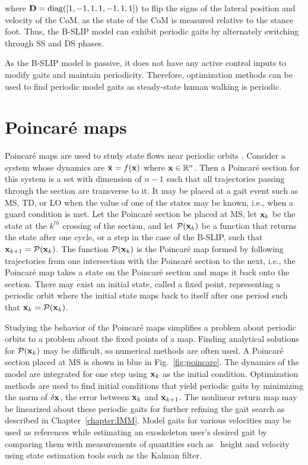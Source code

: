 %
%
where $ \mathbf{D} = {\rm diag}([1 ,-1 ,1 ,1 ,-1 ,1 ,1]) $ to flip the signs of the lateral position and velocity of the CoM, as the state of the CoM is measured relative to the stance foot. Thus, the B-SLIP model can exhibit periodic gaits by alternately switching through SS and DS phases.

As the B-SLIP model is passive, it does not have any active control inputs to modify gaits and maintain periodicity. Therefore, optimization methods can be used to find periodic model gaits \cite{strogatz2018nonlinear,garcia1998simplest} as steady-state human walking is periodic. 

\section{Poincar\'e maps}

Poincar\'e maps are used to study state flows near periodic orbits \cite{strogatz2018nonlinear}. Consider a system whose dynamics are $ \dot{\mathbf{x}} = f(\mathbf{x}) $ where $ \mathbf{x} \in \mathbb{R}^n $. Then a  Poincar\'e section for this system is a set with dimension of $ n-1 $ such that all trajectories passing through the section are transverse to it. It may be placed at a gait event such as MS, TD, or LO when the value of one of the states may be known, i.e., when a guard condition is met. Let the Poincar\'e section be placed at MS, let $ \mathbf{x}_k $ be the state at the $ k^{th} $ crossing of the section, and let $ \mathcal{P}(\mathbf{x}_k) $ be a function that returns the state after one cycle, or a step in the case of the B-SLIP, such that $ \mathbf{x}_{k+1} = \mathcal{P}(\mathbf{x}_k) $. The function $ \mathcal{P}(\mathbf{x}_k) $ is the Poincar\'e map formed by following trajectories from one intersection with the Poincar\'e section to the next, i.e., the Poincar\'e map takes a state on the Poincar\'e section and maps it back onto the section. There may exist an initial state, called a fixed point, representing a periodic orbit where the initial state maps back to itself after one period such that $ \mathbf{x}_k = \mathcal{P}(\mathbf{x}_k) $. 

Studying the behavior of the Poincar\'e maps simplifies a problem about periodic orbits to a problem about the fixed points of a map. Finding analytical solutions for $ \mathcal{P}(\mathbf{x}_k) $ may be difficult, so numerical methods are often used. A Poincar\'e section placed at MS is shown in blue in Fig.~\ref{fig:poincare}. The dynamics of the model are integrated for one step using $ \mathbf{x}_k $ as the initial condition. Optimization methods are used to find initial conditions that yield periodic gaits by minimizing the norm of $ \delta \mathbf{x} $, the error between $ \mathbf{x}_k $ and $ \mathbf{x}_{k+1} $. The nonlinear return map may be linearized about these periodic gaits for further refining the gait search as described in Chapter~\ref{chapter:IMM}. Model gaits for various velocities may be used as references while estimating an exoskeleton user's desired gait by comparing them with measurements of quantities such as \COM~height and velocity using state estimation tools such as the Kalman filter. 

